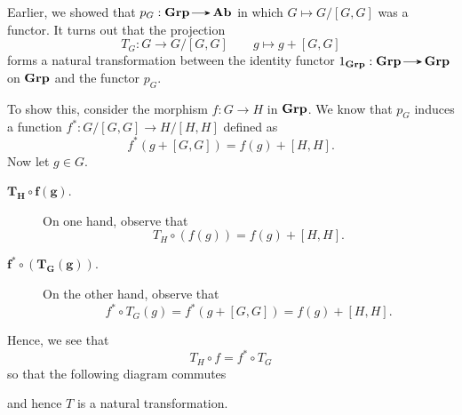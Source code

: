     \begin{example}
        Earlier, we showed that $p_G: \grp \to \ab$ in which $G \mapsto G/[G, G]$ was a functor. It
        turns out that the projection 
        \[ 
            T_G : G \to G/[G, G] \qquad g \mapsto g + [G, G]
        \] 
        forms a natural transformation between
        the identity functor $1_{\grp}: \grp \to
        \grp$ on $\operatorname{\mathbf{Grp}}$ and the 
        functor $p_G$. 

        To show this, consider the morphism $f: G \to H$ in
        $\operatorname{\mathbf{Grp}}$. We know that $p_G$ induces a function $f^*:
        G/[G, G] \to H/[H, H]$ defined as 
        \[
            f^*(g + [G, G]) = f(g) + [H,H].
        \]
        Now let $g \in G$. 
        \begin{description}
            \item[$\bm{T_H\circ f(g)}$.] On one hand, observe that 
            \[
                T_H \circ (f(g)) =  f(g) + [H, H]. 
            \] 
            \item[$\bm{f^*\circ (T_G(g))}$.] On the other hand,
            observe that 
            \[
                f^*\circ T_G(g) = f^*(g + [G, G]) = f(g) + [H, H].  
            \]
        \end{description}
        Hence, we see that 
        \[
            T_H\circ f = f^*\circ T_G
        \]
        so that the following diagram commutes 
        \begin{center}
        \end{center}
        and hence $T$ is a natural transformation.
    \end{example}


